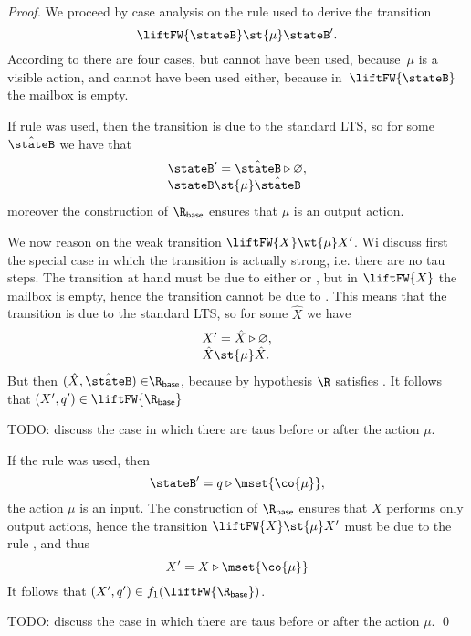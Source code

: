 {\begin{proof}
    
    We proceed by case analysis on the rule used to derive the transition
    $$
    \liftFW{\stateB} \st{\mu} \stateB'.
    $$
    According to 
    there are four cases, but  cannot have been used,
    because~$\mu$ is a visible action, and  cannot have been used either,
    because in~$\liftFW{\stateB}$ the mailbox is empty.


    If rule  was used, then the transition is due to the standard LTS,
    so for some $\hat{\stateB}$ we have that
    $$
    \begin{array}{l}
      \stateB' = \hat{\stateB} \triangleright \varnothing,\\
      \stateB \st{\mu} \hat{\stateB}
    \end{array}
    $$
    moreover the construction of $\Rbase$ ensures that $\mu$ is an output action.
    
    We now reason on the weak transition $ \liftFW{ X } \wt{ \mu } X'$.
    Wi discuss first the special case in which the transition is actually strong, i.e. there are no tau steps.
    The transition at hand must be due to either  or , but
    in $ \liftFW{ X } $ the mailbox is empty, hence the transition cannot
    be due to . This means that the transition is due to the standard LTS, so for
    some $\hat{X}$ we have
    $$
    \begin{array}{l}
      X' = \hat{X} \triangleright \varnothing,\\
      \hat{ X } \st{\mu} \hat{X}.
    \end{array}
    $$
    But then $( \hat{X}, \hat{\stateB}) \in \Rbase$, because by hypothesis $\R$ satisfies
    .
    It follows that $(X', q') \in \liftFW{\Rbase}$ 

    TODO: discuss the case in which there are taus before or after the action $\mu$.

    
    If the rule  was used, then
    $$
    \stateB' = q \triangleright \mset{\co{\mu}},
    $$
    the action $\mu$ is an input.
    The construction of $\Rbase$ ensures that $X$ performs only output actions,
    hence the transition $\liftFW{ X } \st{\mu} X' $ must be due to
    the rule  , and thus
    $$
    X' = X \triangleright \mset{\co{\mu}}
    $$
    It follows that $(X', q') \in f_1(\liftFW{\Rbase})$.

    TODO: discuss the case in which there are taus before or after the action $\mu$. \qed
  \end{proof}

}
